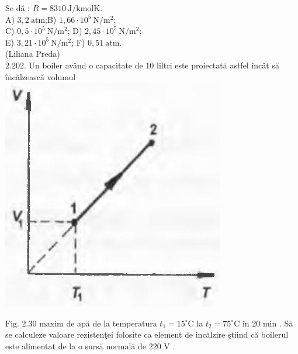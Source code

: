 \documentclass[10pt]{article}
\begin{document}
Se dă : $R=8310 \mathrm{~J} / \mathrm{kmolK}$.\\
A) $3,2 \mathrm{~atm}$;B) $1,66 \cdot 10^{5} \mathrm{~N} / \mathrm{m}^{2}$;\\
C) $0,5 \cdot 10^{5} \mathrm{~N} / \mathrm{m}^{2}$; D) $2,45 \cdot 10^{5} \mathrm{~N} / \mathrm{m}^{2}$;\\
E) $3,21 \cdot 10^{5} \mathrm{~N} / \mathrm{m}^{2}$; F) $0,51 \mathrm{~atm}$.\\
(Liliana Preda)\\
2.202. Un boiler având o capacitate de 10 liltri este proiectată astfel încât să încălzească volumul\\
\includegraphics[max width=\textwidth, center]{2025_07_01_5b3ff9fa0d508c8e9f17g-119}

Fig. 2.30 maxim de apă de la temperatura $t_{1}=15^{\circ} \mathrm{C}$ la $t_{2}=75^{\circ} \mathrm{C}$ în 20 min . Să se calculeze valoare rezistenţei folosite ca element de incălzire ştiind că boilerul este alimentat de la o sursă normală de 220 V .
\end{document}
